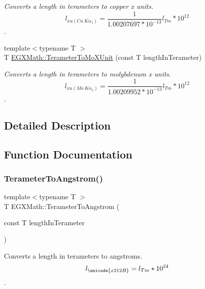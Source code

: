 \begin{DoxyCompactItemize}
\begin{DoxyCompactList}\small\item\em Converts a length in terameters to copper x units. \[ l_{xu(Cu\ K\alpha_1)}= \frac{1}{1.00207697*10^{-13}} l_{Tm} * 10^{12}\]. \end{DoxyCompactList}\item 
{\footnotesize template$<$typename T $>$ }\\T \mbox{\hyperlink{group___e_g_x_math-_conversions-_length_conversions-_s_i-_terameter-_non-_s_i_ga391bcf9b529c2e20f2773c699bb0197a}{E\+G\+X\+Math\+::\+Terameter\+To\+Mo\+X\+Unit}} (const T length\+In\+Terameter)
\begin{DoxyCompactList}\small\item\em Converts a length in terameters to molybdenum x units. \[ l_{xu(Mo\ K\alpha_1)}=\frac{1}{1.00209952*10^{-13}} l_{Tm} * 10^{12}\]. \end{DoxyCompactList}\end{DoxyCompactItemize}


\subsection{Detailed Description}


\subsection{Function Documentation}
\mbox{\label{group___e_g_x_math-_conversions-_length_conversions-_s_i-_terameter-_non-_s_i_gaab75399e224bea4ea7ddb8bf5f557ee0}} 
\subsubsection{\texorpdfstring{Terameter\+To\+Angstrom()}{TerameterToAngstrom()}}
{\footnotesize\ttfamily template$<$typename T $>$ \\
T E\+G\+X\+Math\+::\+Terameter\+To\+Angstrom (\begin{DoxyParamCaption}\item[{const T}]{length\+In\+Terameter }\end{DoxyParamCaption})}



Converts a length in terameters to angstroms. \[ l_{\unicode{x212B}}=l_{Tm} * 10^{24} \]. 

